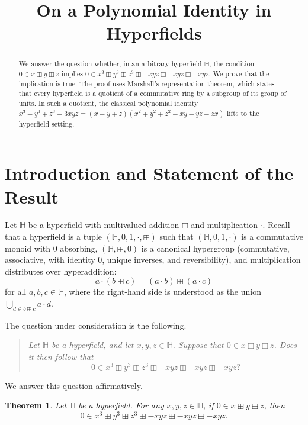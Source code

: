\documentclass[11pt]{article}
\newtheorem{theorem}{Theorem}[section]
\begin{document}
\title{On a Polynomial Identity in Hyperfields}
\author{}
\date{}
\maketitle

\begin{abstract}
We answer the question whether, in an arbitrary hyperfield $\mathbb{H}$, the condition
$0 \in x \boxplus y \boxplus z$ implies
$0 \in x^3 \boxplus y^3 \boxplus z^3 \boxplus -xyz \boxplus -xyz \boxplus -xyz$.
We prove that the implication is true. The proof uses Marshall's representation theorem,
which states that every hyperfield is a quotient of a commutative ring by a subgroup of its
group of units. In such a quotient, the classical polynomial identity
$x^3+y^3+z^3-3xyz = (x+y+z)(x^2+y^2+z^2-xy-yz-zx)$ lifts to the hyperfield setting.
\end{abstract}

\section{Introduction and Statement of the Result}

Let $\mathbb{H}$ be a hyperfield with multivalued addition $\boxplus$ and multiplication $\cdot$.
Recall that a hyperfield is a tuple $(\mathbb{H},0,1,\cdot,\boxplus)$ such that
$(\mathbb{H},0,1,\cdot)$ is a commutative monoid with $0$ absorbing,
$(\mathbb{H},\boxplus,0)$ is a canonical hypergroup (commutative, associative, with identity
$0$, unique inverses, and reversibility), and multiplication distributes over hyperaddition:
\[
a \cdot (b \boxplus c) = (a\cdot b) \boxplus (a\cdot c)
\]
for all $a,b,c \in \mathbb{H}$, where the right-hand side is understood as the union
$\bigcup_{d \in b \boxplus c} a\cdot d$.

The question under consideration is the following.

\begin{quote}
\itshape
Let $\mathbb{H}$ be a hyperfield, and let $x,y,z \in \mathbb{H}$.
Suppose that $0 \in x \boxplus y \boxplus z$.
Does it then follow that
\[
0 \in x^3 \boxplus y^3 \boxplus z^3 \boxplus -xyz \boxplus -xyz \boxplus -xyz \text{?}
\]
\end{quote}

We answer this question affirmatively.

\begin{theorem}\label{thm:main}
Let $\mathbb{H}$ be a hyperfield. For any $x,y,z \in \mathbb{H}$, if
$0 \in x \boxplus y \boxplus z$, then
\[
0 \in x^3 \boxplus y^3 \boxplus z^3 \boxplus -xyz \boxplus -xyz \boxplus -xyz.
\]
\end{theorem}
\end{document}
